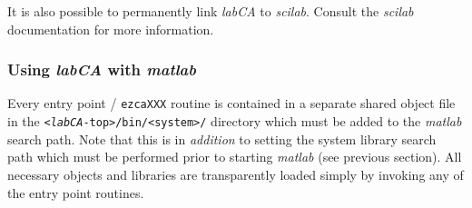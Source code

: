 \documentclass{article}
\newcommand{\sca}{\ita{labCA}}
\newcommand{\scilab}{\ita{scilab}}
\newcommand{\matlab}{\ita{matlab}}
\newcommand{\com}[1]{{\tt #1}}
\newcommand{\ita}[1]{\emph{#1}}
\begin{document}
It is also possible to permanently link \sca{} to \scilab{}. Consult
the \scilab{} documentation for more information.

\subsubsection{Using \sca{} with \matlab}
Every entry point / \com{ezcaXXX} routine is contained in a separate
shared object file in the \com{<\sca-top>/bin/<system>/} directory
which must be added to the \matlab{} search path.
Note that this is in \ita{addition}
to setting the system library search path which must be performed prior
to starting \matlab{} (see previous section).
All necessary objects and libraries are transparently loaded simply
by invoking any of the entry point routines.
\end{document}
